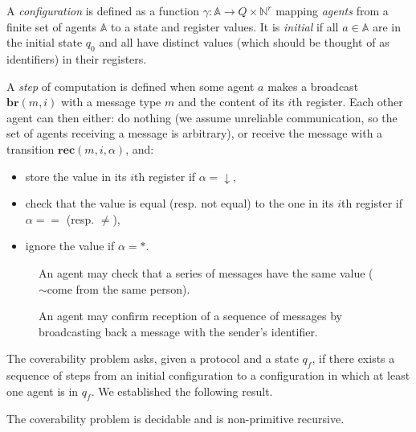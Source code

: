 \documentclass{article}
\newcommand{\nats}{\mathbb{N}}
\theoremstyle{definition}
\begin{document}
		
		A \emph{configuration} is defined as a function $\gamma : \mathbb{A} \to Q \times \nats^{r}$ mapping \emph{agents} from a finite set of agents $\mathbb{A}$ to a state and register values. It is \emph{initial} if all $a \in \mathbb{A}$ are in the initial state $q_0$ and all have distinct values (which should be thought of as identifiers) in their registers. 
			
		A \emph{step} of computation is defined when some agent $a$ makes a broadcast $\mathbf{br}(m,i)$ with a message type $m$ and the content of its $i$th register. Each other agent can then either:
		 do nothing (we assume unreliable communication, so the set of agents receiving a message is arbitrary), or  receive the message with a transition $\mathbf{rec}(m, i, \alpha)$, and:\vspace{-0.3cm}
				\begin{itemize}
					\item store the value in its $i$th register if $\alpha = \downarrow$,
					\item check that the value is equal (resp. not equal) to the one in its $i$th register if $\alpha = =$ (resp. $\neq$),
					\item ignore the value if $\alpha=*$.
				\end{itemize}
	
	\begin{figure}[h]
		\centering
		\begin{minipage}{.47\textwidth}
		\centering
		
		\caption{An agent may check that a series of messages have the same value ($\sim$come from the same person).}
		\label{fig:pred}
		\end{minipage}%
		\hfill
		\begin{minipage}{.47\textwidth}
		\centering
		
		\label{fig:suc}
		\caption{An agent may confirm reception of a sequence of messages by broadcasting back a message with the sender's identifier.}
		\end{minipage}
	\end{figure}
	
	
	The coverability problem asks, given a protocol and a state $q_f$, if there exists a sequence of steps from an initial configuration to a configuration in which at least one agent is in $q_f$. We established the following result.
	
	\begin{theorem}
		The coverability problem is decidable and is non-primitive recursive.
	\end{theorem}
\end{document}
